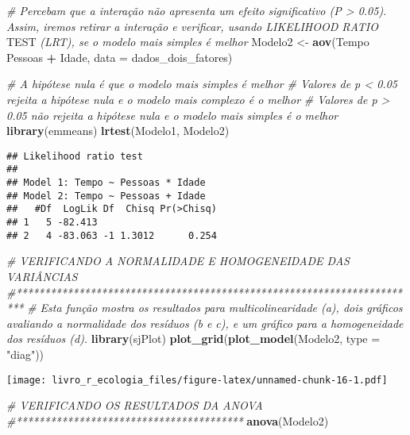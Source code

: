 \documentclass[
]{book}
\newenvironment{Shaded}{\begin{snugshade}}{\end{snugshade}}
\newcommand{\AlertTok}[1]{\textcolor[rgb]{0.94,0.16,0.16}{#1}}
\newcommand{\CommentTok}[1]{\textcolor[rgb]{0.56,0.35,0.01}{\textit{#1}}}
\newcommand{\DataTypeTok}[1]{\textcolor[rgb]{0.13,0.29,0.53}{#1}}
\newcommand{\KeywordTok}[1]{\textcolor[rgb]{0.13,0.29,0.53}{\textbf{#1}}}
\newcommand{\NormalTok}[1]{#1}
\newcommand{\OperatorTok}[1]{\textcolor[rgb]{0.81,0.36,0.00}{\textbf{#1}}}
\newcommand{\StringTok}[1]{\textcolor[rgb]{0.31,0.60,0.02}{#1}}
\begin{document}
\begin{Shaded}
\begin{Highlighting}[]
\CommentTok{# Percebam que a interação não apresenta um efeito significativo (P > 0.05). Assim, iremos retirar a interação e verificar, usando LIKELIHOOD RATIO }\AlertTok{TEST}\CommentTok{ (LRT), se o modelo mais simples é melhor }
\NormalTok{Modelo2 <-}\StringTok{ }\KeywordTok{aov}\NormalTok{(Tempo }\OperatorTok{~}\StringTok{ }\NormalTok{Pessoas }\OperatorTok{+}\StringTok{ }\NormalTok{Idade, }\DataTypeTok{data =}\NormalTok{ dados_dois_fatores) }

\CommentTok{# A hipótese nula é que o modelo mais simples é melhor}
\CommentTok{# Valores de p < 0.05 rejeita a hipótese nula e o modelo mais complexo é o melhor}
\CommentTok{# Valores de p > 0.05 não rejeita a hipótese nula e o modelo mais simples é o melhor}
\KeywordTok{library}\NormalTok{(emmeans)}
\KeywordTok{lrtest}\NormalTok{(Modelo1, Modelo2)}
\end{Highlighting}
\end{Shaded}

\begin{verbatim}
## Likelihood ratio test
## 
## Model 1: Tempo ~ Pessoas * Idade
## Model 2: Tempo ~ Pessoas + Idade
##   #Df  LogLik Df  Chisq Pr(>Chisq)
## 1   5 -82.413                     
## 2   4 -83.063 -1 1.3012      0.254
\end{verbatim}

\begin{Shaded}
\begin{Highlighting}[]
\CommentTok{# VERIFICANDO A NORMALIDADE E HOMOGENEIDADE DAS VARIÂNCIAS}
\CommentTok{#***********************************************************************}
\CommentTok{# Esta função mostra os resultados para multicolinearidade (a), dois gráficos avaliando a normalidade dos resíduos (b e  c), e um gráfico para a homogeneidade dos resíduos (d).}
\KeywordTok{library}\NormalTok{(sjPlot)}
\KeywordTok{plot_grid}\NormalTok{(}\KeywordTok{plot_model}\NormalTok{(Modelo2, }\DataTypeTok{type =} \StringTok{"diag"}\NormalTok{))}
\end{Highlighting}
\end{Shaded}

\texttt{[image: livro\_r\_ecologia\_files/figure-latex/unnamed-chunk-16-1.pdf]}

\begin{Shaded}
\begin{Highlighting}[]
\CommentTok{# VERIFICANDO OS RESULTADOS DA ANOVA}
\CommentTok{#****************************************}
\KeywordTok{anova}\NormalTok{(Modelo2)}
\end{Highlighting}
\end{Shaded}
\end{document}
